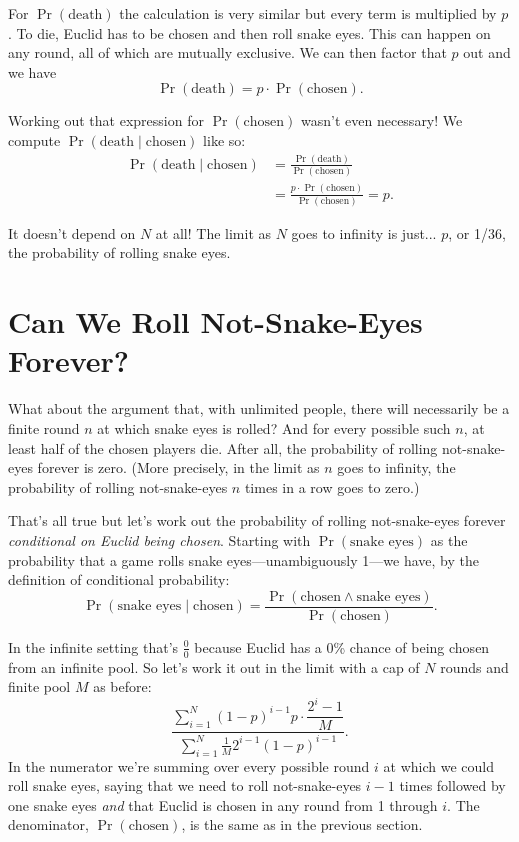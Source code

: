 \documentclass[article,twocolumn]{memoir}
\begin{document}
For $\Pr(\text{death})$ the calculation is very similar but every term is multiplied by $p$.
To die, Euclid has to be chosen and then roll snake eyes.
This can happen on any round, all of which are mutually exclusive.
We can then factor that $p$ out and we have
$$\Pr(\text{death}) = p\cdot\Pr(\text{chosen}).$$

Working out that expression for $\Pr(\text{chosen})$ wasn't even necessary!
We compute $\Pr(\text{death}\mid\text{chosen})$ like so:
\begin{equation*}
\begin{split}
\Pr(\text{death}\mid\text{chosen}) & = 
\frac{\Pr(\text{death})}{\Pr(\text{chosen})} \\
& = \frac{p\cdot\Pr(\text{chosen})}{\Pr(\text{chosen})} = 
p.
\end{split}
\end{equation*}

It doesn't depend on $N$ at all!
The limit as $N$ goes to infinity is just... 
$p$, or 1/36, the probability of rolling snake eyes.
\qedsymbol{}

\chapter{Can We Roll Not-Snake-Eyes Forever?}

What about the argument that, with unlimited people, there will necessarily be a finite round $n$ at which snake eyes is rolled?
And for every possible such $n$, at least half of the chosen players die.
After all, the probability of rolling not-snake-eyes forever is zero.
(More precisely, in the limit as $n$ goes to infinity, the probability of rolling not-snake-eyes $n$ times in a row goes to zero.)

That's all true but let's work out the probability of rolling not-snake-eyes forever \emph{conditional on Euclid being chosen}.
Starting with $\Pr(\text{snake eyes})$ as the probability that a game rolls snake eyes---unambiguously 1---we have, by the definition of conditional probability:
\begin{equation*}
\Pr(\text{snake eyes}\mid\text{chosen})
= \frac{\Pr(\text{chosen} \land \text{snake eyes})}{\Pr(\text{chosen})}.
\end{equation*}

In the infinite setting that's
$\tfrac{0}{0}$
because Euclid has a 0\% chance of being chosen from an infinite pool.
So let's work it out in the limit with a cap of $N$ rounds and finite pool $M$ as before:
$$\dfrac
{\sum\limits_{i=1}^{N}(1-p)^{i-1}p \cdot\dfrac{2^i-1}{M}}
{\sum\limits_{i=1}^{N}\tfrac{1}{M} 2^{i-1}(1-p)^{i-1}}.
$$
In the numerator we're summing over every possible round $i$ at which we could roll snake eyes, saying that we need to roll not-snake-eyes $i-1$ times followed by one snake eyes \emph{and} that Euclid is chosen in any round from 1 through $i$.
The denominator, $\Pr(\text{chosen})$, is the same as in the previous section.
\end{document}
